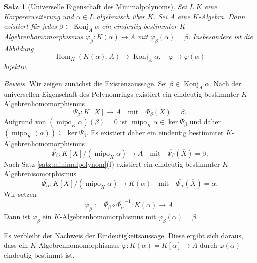 \documentclass[a4paper, twoside, 11pt, ngerman]{report}
\DeclareMathOperator{\Hom}{Hom}
\DeclareMathOperator{\Konj}{Konj}
\DeclareMathOperator{\mipo}{mipo}
\theoremstyle{definistyle}
\newtheorem{satz}{Satz}[section]
\theoremstyle{remark}
\begin{document}
\begin{satz}[Universelle Eigenschaft des Minimalpolynoms]\label{satz:minimalpolynom_universelle_eigenschaft}
Sei $L|K$ eine Körpererweiterung und $\alpha \in L$ algebraisch über $K$. Sei $A$ eine $K$-Algebra. Dann existiert für jedes $\beta \in\Konj_A\alpha$ ein eindeutig bestimmter $K$-Algebrenhomomorphismus $\varphi_\beta \colon K(\alpha) \to A$ mit $\varphi_\beta(\alpha) = \beta$. Insbesondere ist die Abbildung
\[
\Hom_K(K(\alpha), A) \to \Konj_A\alpha, \quad \varphi \mapsto \varphi(\alpha)
\]
bijektiv.
\end{satz}
\begin{proof}[Beweis]
Wir zeigen zunächst die Existenzaussage. Sei $\beta \in\Konj_A\alpha$. Nach der universellen Eigenschaft des Polynomrings existiert ein eindeutig bestimmter $K$-Algebrenhomomorphismus
\[
\Psi_\beta \colon K[X] \to A \quad \text{mit} \quad \Phi_\beta(X) = \beta.
\]
Aufgrund von $(\mipo_K\alpha)(\beta) = 0$ ist $\mipo_K \alpha \in \ker \Psi_\beta$ und daher
$(\mipo_K(\alpha))\subseteq\ker\Psi_\beta$. Es existiert daher ein eindeutig bestimmter $K$-Algebrenhomomorphismus
\[
\overline{\Psi_\beta} \colon K[X]/(\mipo_K \alpha) \to A \quad \text{mit} \quad \overline{\Psi_\beta}(\overline{X}) = \beta.
\]
Nach Satz \ref{satz:minimalpolynom}(f) existiert ein eindeutig bestimmter $K$-Algebrenisomorphismus
\[
\overline{\Phi_\alpha} \colon K[X]/(\mipo_K \alpha) \to K(\alpha) \quad \text{mit} \quad \overline{\Phi_\alpha}(\overline{X}) = \alpha.
\]
Wir setzen
\[\varphi_\beta := \overline{\Psi_\beta} \circ \overline{\Phi_\alpha}^{-1} \colon K(\alpha) \to A.\]
Dann ist $\varphi_\beta$ ein $K$-Algebrenhomomorphismus mit $\varphi_\beta(\alpha) = \beta$.

Es verbleibt der Nachweis der Eindeutigkeitsaussage. Diese ergibt sich daraus, dass ein $K$-Algebrenhomomorphismus $\varphi \colon K(\alpha) = K[\alpha] \to A$ durch $\varphi(\alpha)$ eindeutig bestimmt ist.
\end{proof}
\end{document}
